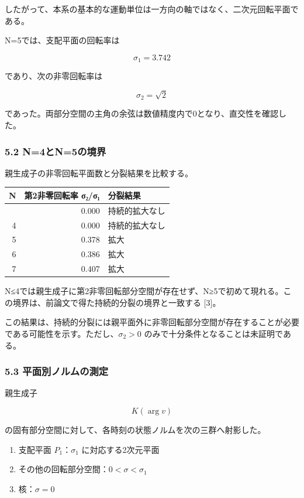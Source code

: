\documentclass[
  a4paper,
]{ltjsarticle}
\newcounter{none} %
\providecommand{\tightlist}{%
  \setlength{\itemsep}{0pt}\setlength{\parskip}{0pt}}
\begin{document}
したがって、本系の基本的な運動単位は一方向の軸ではなく、二次元回転平面である。

N=5では、支配平面の回転率は

\[
\sigma_1=3.742
\]

であり、次の非零回転率は

\[
\sigma_2=\sqrt2
\]

であった。両部分空間の主角の余弦は数値精度内で0となり、直交性を確認した。

\subsubsection{5.2 N=4とN=5の境界}\label{n4ux3068n5ux306eux5883ux754c}

親生成子の非零回転平面数と分裂結果を比較する。

{\def\LTcaptype{none} %
\begin{longtable}[]{@{}rrl@{}}
\toprule\noalign{}
N & 第2非零回転率 σ₂/σ₁ & 分裂結果 \\
\midrule\noalign{}
\endhead
\bottomrule\noalign{}
\endlastfoot
3 & 0.000 & 持続的拡大なし \\
4 & 0.000 & 持続的拡大なし \\
5 & 0.378 & 拡大 \\
6 & 0.386 & 拡大 \\
7 & 0.407 & 拡大 \\
\end{longtable}
}

N≤4では親生成子に第2非零回転部分空間が存在せず、N≥5で初めて現れる。この境界は、前論文で得た持続的分裂の境界と一致する
{[}3{]}。

この結果は、持続的分裂には親平面外に非零回転部分空間が存在することが必要である可能性を示す。ただし、\(\sigma_2>0\)
のみで十分条件となることは未証明である。

\subsubsection{5.3
平面別ノルムの測定}\label{ux5e73ux9762ux5225ux30ceux30ebux30e0ux306eux6e2cux5b9a}

親生成子

\[
K(\arg v)
\]

の固有部分空間に対して、各時刻の状態ノルムを次の三群へ射影した。

\begin{enumerate}
\def\labelenumi{\arabic{enumi}.}
\tightlist
\item
  支配平面 \(P_1\)：\(\sigma_1\) に対応する2次元平面
\item
  その他の回転部分空間：\(0<\sigma<\sigma_1\)
\item
  核：\(\sigma=0\)
\end{enumerate}
\end{document}
